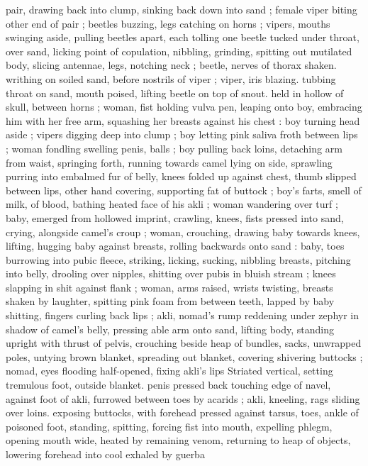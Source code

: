 pair, drawing back into clump, sinking back down into sand ; female
viper biting other end of pair ; beetles buzzing, legs catching on
horns ; vipers, mouths swinging aside, pulling beetles apart, each
tolling one beetle tucked under throat, over sand, licking point of
copulation, nibbling, grinding, spitting out mutilated body, slicing
antennae, legs, notching neck ; beetle, nerves of thorax shaken.
writhing on soiled sand, before nostrils of viper ; viper, iris blazing.
tubbing throat on sand, mouth poised, lifting beetle on top of snout.
held in hollow of skull, between horns ; woman, fist holding vulva
pen, leaping onto boy, embracing him with her free arm, squashing
her breasts against his chest : boy turning head aside ; vipers
digging deep into clump ; boy letting pink saliva froth between lips ;
woman fondling swelling penis, balls ; boy pulling back loins,
detaching arm from waist, springing forth, running towards camel
lying on side, sprawling purring into embalmed fur of belly, knees
folded up against chest, thumb slipped between lips, other hand
covering, supporting fat of buttock ; boy's farts, smell of milk, of
blood, bathing heated face of his akli ; woman wandering over turf ;
baby, emerged from hollowed imprint, crawling, knees, fists pressed
into sand, crying, alongside camel's croup ; woman, crouching,
drawing baby towards knees, lifting, hugging baby against breasts,
rolling backwards onto sand : baby, toes burrowing into pubic fleece,
striking, licking, sucking, nibbling breasts, pitching into belly,
drooling over nipples, shitting over pubis in bluish stream ; knees
slapping in shit against flank ; woman, arms raised, wrists twisting,
breasts shaken by laughter, spitting pink foam from between teeth,
lapped by baby shitting, fingers curling back lips ; akli, nomad's
rump reddening under zephyr in shadow of camel's belly, pressing
able arm onto sand, lifting body, standing upright with thrust of
pelvis, crouching beside heap of bundles, sacks, unwrapped poles,
untying brown blanket, spreading out blanket, covering shivering
buttocks ; nomad, eyes flooding half-opened, fixing akli’s lips
Striated vertical, setting tremulous foot, outside blanket. penis
pressed back touching edge of navel, against foot of akli, furrowed
between toes by acarids ; akli, kneeling, rags sliding over loins.
exposing buttocks, with forehead pressed against tarsus, toes, ankle
of poisoned foot, standing, spitting, forcing fist into mouth, expelling
phlegm, opening mouth wide, heated by remaining venom, returning
to heap of objects, lowering forehead into cool exhaled by guerba
